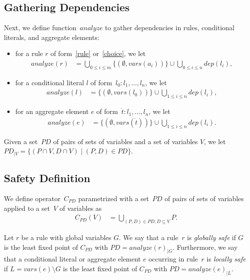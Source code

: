 \documentclass{article}
\newcommand{\tuple}[1]{\dot{#1}}
\newcommand{\set}[1]{\{#1\}}
\newcommand\Vars{\mathit{vars}}
\newcommand\ProDep{\mathit{dep}}
\newcommand\Analyze{\mathit{analyze}}
\newcommand\PD{\mathit{P\!D}}
\newcommand\CheckOp[1]{C_{#1}}
\begin{document}
\subsection{Gathering Dependencies}
	Next, we define function~$\Analyze$ to gather dependencies in rules, conditional literals, and aggregate elements:
	\begin{itemize}
		\item
			for a rule $r$ of form~\eqref{rule} or~\eqref{choice}, we let
			\begin{align*}
				\Analyze(r) &= \bigcup_{0 \leq i \leq m} \set{(\emptyset, \Vars(a_i))} \cup \bigcup_{0 \leq i \leq n} \ProDep(l_i),
			\end{align*}
		\item
			for a conditional literal $l$ of form~$l_0 : l_1, \dots, l_n$, we let
			\begin{align*}
				\Analyze(l) &= \set{(\emptyset, \Vars(l_0))} \cup \bigcup_{1 \leq i \leq n} \ProDep(l_i),
			\end{align*}
		\item
			for an aggregate element $e$ of form~$\tuple{t}: l_1, \dots, l_n$, we let
			\begin{align*}
				\Analyze(e) &= \set{(\emptyset, \Vars(\tuple{t}))} \cup \bigcup_{1 \leq i \leq n} \ProDep(l_i).
			\end{align*}
	\end{itemize}
	Given a set~$\PD$ of pairs of sets of variables and a set of variables $V$, we let $\PD_{|V} = \set{(P \cap V, D \cap V) \mid (P, D) \in \PD}$.


	\subsection{Safety Definition}
	We define operator~$\CheckOp{\PD}$ parametrized with a set~$\PD$ of pairs of sets of variables
	applied to a set~$V$ of variables as
	\begin{align*}
	\CheckOp{\PD}(V) &= \bigcup_{(P,D) \in \PD, D \subseteq V} P.
	\end{align*}

	Let $r$ be a rule with global variables $G$.
	We say that a rule~$r$ is \emph{globally safe}
	if $G$ is the least fixed point of $\CheckOp{\PD}$ with $\PD=\Analyze{(r)}_{|G}$.
	Furthermore, we say that a conditional literal or aggregate element $e$ occurring in rule~$r$ is \emph{locally safe}
	if $L = \Vars(e) \setminus G$ is the least fixed point of $\CheckOp{\PD}$ with $\PD=\Analyze{(e)}_{|L}$.
\end{document}
